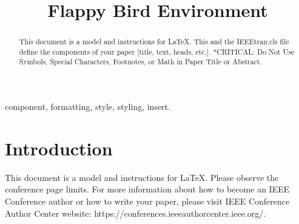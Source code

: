 \documentclass[conference]{IEEEtran}
\begin{document}
\title{Flappy Bird Environment\\}

\author{
\and
{}
\and
{}
\and
{}
}

\maketitle

\begin{abstract}
This document is a model and instructions for \LaTeX.
This and the IEEEtran.cls file define the components of your paper [title, text, heads, etc.]. *CRITICAL: Do Not Use Symbols, Special Characters, Footnotes, 
or Math in Paper Title or Abstract.
\end{abstract}

\begin{IEEEkeywords}
component, formatting, style, styling, insert.
\end{IEEEkeywords}

\section{Introduction}
This document is a model and instructions for \LaTeX.
Please observe the conference page limits. For more information about how to become an IEEE Conference author or how to write your paper, please visit   IEEE Conference Author Center website: https://conferences.ieeeauthorcenter.ieee.org/.
\end{document}
